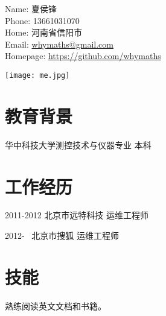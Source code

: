 \documentclass[a4paper,12pt,onecolumn]{article}
\renewenvironment{itemize}{
  \begin{list}{}{
    \setlength{\leftmargin}{1.5em}
    \setlength{\itemsep}{0.25em}
    \setlength{\parskip}{0pt}
    \setlength{\parsep}{0.25em}
  }
}{
  \end{list}
}
\begin{document}
\begin{minipage}{0.495\textwidth}
  Name: 夏侯锋 \\
  Phone: 13661031070 \\
  Home: 河南省信阳市 \\
  Email: \href{mailto:whymaths@gmail.com}{whymaths@gmail.com} \\
  Homepage: \href{https://github.com/whymaths/}{https://github.com/whymaths}
\end{minipage}
\begin{minipage}{0.495\columnwidth}
\centering
\texttt{[image: me.jpg]}
\end{minipage}



\section{教育背景}
\begin{itemize}
        \item 华中科技大学测控技术与仪器专业 本科
\end{itemize}

\section{工作经历}
\begin{itemize}
        \item 2011-2012 北京市远特科技 运维工程师
        \item 2012-~ 北京市搜狐 运维工程师
\end{itemize}

\section{技能}
\begin{itemize}
        \item 熟练阅读英文文档和书籍。
\end{itemize}
\end{document}
